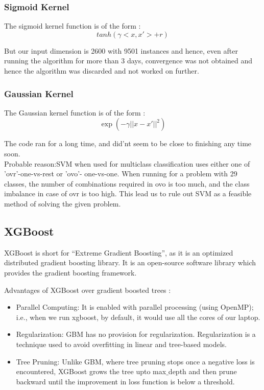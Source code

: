 \documentclass[12pt]{report}
\begin{document}
\subsubsection{Sigmoid Kernel}
The sigmoid kernel function is of the form :
$$tanh(\gamma<x,x'> + r)$$

But our input dimension is 2600 with 9501 instances and hence, even after running the algorithm for more than 3 days, convergence was not obtained and hence the algorithm was discarded and not worked on further.

\subsubsection{Gaussian Kernel}
The Gaussian kernel function is of the form :
$$\exp(-\gamma||x-x'||^{2})$$

The code ran for a long time, and did'nt seem to be close to finishing any time soon.\\

Probable reason:SVM when used for multiclass classification uses either one of 'ovr'-one-vs-rest or 'ovo'- one-vs-one. When running for a problem  with 29 classes, the number of combinations required in ovo is too much, and the class imbalance in case of ovr is too high. This lead us to rule out SVM as a feasible method of solving the given problem.


\subsection{XGBoost}
XGBoost is short for “Extreme Gradient Boosting”, as it is an optimized distributed gradient boosting library. It is an open-source software library which provides the gradient boosting framework.

Advantages of XGBoost over gradient boosted trees :
\begin{itemize}
    \item Parallel Computing: It is enabled with parallel processing (using OpenMP); i.e., when we run xgboost, by default, it would use all the cores of our laptop.
    \item Regularization: GBM has no provision for regularization. Regularization is a technique used to avoid overfitting in linear and tree-based models.
    \item Tree Pruning: Unlike GBM, where tree pruning stops once a negative loss is encountered, XGBoost grows the tree upto max$\_$depth and then prune backward until the improvement in loss function is below a threshold.
\end{itemize}
\end{document}
